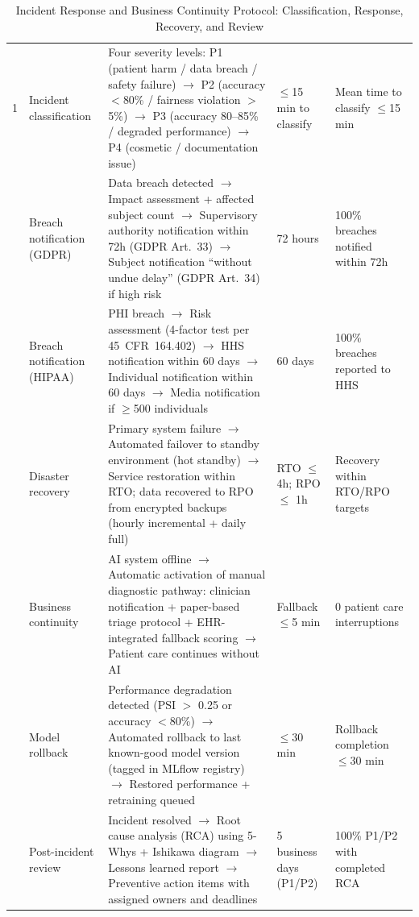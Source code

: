 \begin{table}[!htbp]
\tablestripes
\tablefontsize
\caption[Incident Response and Business Continuity Protocol]{Incident Response and Business Continuity Protocol: Classification, Response, Recovery, and Review}
\begin{tabularx}{\textwidth}{@{} p{0.4cm} p{1.8cm} L p{1.8cm} p{1.8cm} @{}}
\toprule
\thead{\#} &  &  &  &  \\
 & Incident classification & Four severity levels: P1 (patient harm / data breach / safety failure) $\to$ P2 (accuracy $<$80\% / fairness violation $>$5\%) $\to$ P3 (accuracy 80--85\% / degraded performance) $\to$ P4 (cosmetic / documentation issue) & $\leq$15 min to classify & Mean time to classify $\leq$15 min \\
 & Breach notification (GDPR) & Data breach detected $\to$ Impact assessment + affected subject count $\to$ Supervisory authority notification within 72h (GDPR Art.~33) $\to$ Subject notification ``without undue delay'' (GDPR Art.~34) if high risk & 72 hours & 100\% breaches notified within 72h \\
 & Breach notification (HIPAA) & PHI breach $\to$ Risk assessment (4-factor test per 45~CFR~164.402) $\to$ HHS notification within 60 days $\to$ Individual notification within 60 days $\to$ Media notification if $\geq$500 individuals & 60 days & 100\% breaches reported to HHS \\
 & Disaster recovery & Primary system failure $\to$ Automated failover to standby environment (hot standby) $\to$ Service restoration within RTO; data recovered to RPO from encrypted backups (hourly incremental + daily full) & RTO $\leq$ 4h; RPO $\leq$ 1h & Recovery within RTO/RPO targets \\
 & Business continuity & AI system offline $\to$ Automatic activation of manual diagnostic pathway: clinician notification + paper-based triage protocol + EHR-integrated fallback scoring $\to$ Patient care continues without AI & Fallback $\leq$5 min & 0 patient care interruptions \\
 & Model rollback & Performance degradation detected (PSI $>$ 0.25 or accuracy $<$80\%) $\to$ Automated rollback to last known-good model version (tagged in MLflow registry) $\to$ Restored performance + retraining queued & $\leq$30 min & Rollback completion $\leq$30 min \\
 & Post-incident review & Incident resolved $\to$ Root cause analysis (RCA) using 5-Whys + Ishikawa diagram $\to$ Lessons learned report $\to$ Preventive action items with assigned owners and deadlines & 5 business days (P1/P2) & 100\% P1/P2 with completed RCA \\

\end{tabularx}
\end{table}
